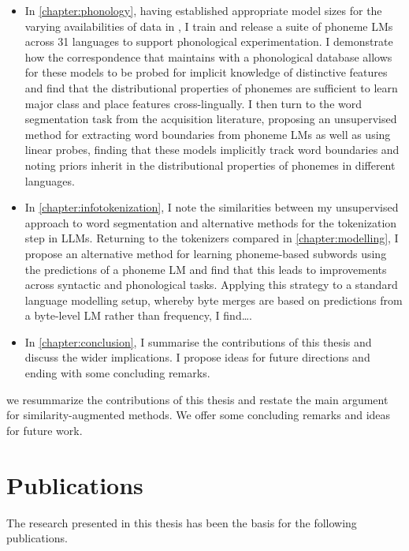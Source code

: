 \begin{itemize}
    \item In \cref{chapter:phonology}, having established appropriate model sizes for the varying availabilities of data in \ipachildes, I train and release a suite of phoneme LMs across 31 languages to support phonological experimentation. I demonstrate how the correspondence that \gpp maintains with a phonological database allows for these models to be probed for implicit knowledge of distinctive features and find that the distributional properties of phonemes are sufficient to learn major class and place features cross-lingually. I then turn to the word segmentation task from the acquisition literature, proposing an unsupervised method for extracting word boundaries from phoneme LMs as well as using linear probes, finding that these models implicitly track word boundaries and noting priors inherit in the distributional properties of phonemes in different languages.
    \item In \cref{chapter:infotokenization}, I note the similarities between my unsupervised approach to word segmentation and alternative methods for the tokenization step in LLMs. Returning to the tokenizers compared in \cref{chapter:modelling}, I propose an alternative method for learning phoneme-based subwords using the predictions of a phoneme LM and find that this leads to improvements across syntactic and phonological tasks. Applying this strategy to a standard language modelling setup, whereby byte merges are based on predictions from a byte-level LM rather than frequency, I find\ldots {}. 
    \item In \cref{chapter:conclusion}, I summarise the contributions of this thesis and discuss the wider implications. I propose ideas for future directions and ending with some concluding remarks.
\end{itemize}


we resummarize the contributions of this thesis and restate the main argument for similarity-augmented methods. We offer some concluding remarks and ideas for future work.
\section{Publications}

The research presented in this thesis has been the basis for the following publications.

